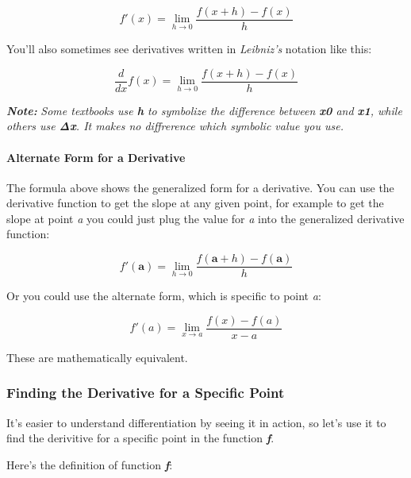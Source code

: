 \documentclass[11pt]{article}
\begin{document}
\begin{equation}f'(x) = \lim_{h \to 0} \frac{f(x + h) - f(x)}{h} \end{equation}

You'll also sometimes see derivatives written in \emph{Leibniz's}
notation like this:

\begin{equation}\frac{d}{dx}f(x) = \lim_{h \to 0} \frac{f(x + h) - f(x)}{h} \end{equation}

\textbf{\emph{Note:}} \emph{Some textbooks use \textbf{h} to symbolize
the difference between \textbf{x0} and \textbf{x1}, while others use
\textbf{Δx}. It makes no diffrerence which symbolic value you use.}

    \paragraph{Alternate Form for a
Derivative}\label{alternate-form-for-a-derivative}

The formula above shows the generalized form for a derivative. You can
use the derivative function to get the slope at any given point, for
example to get the slope at point \emph{a} you could just plug the value
for \emph{a} into the generalized derivative function:

\begin{equation}f'(\textbf{a}) = \lim_{h \to 0} \frac{f(\textbf{a} + h) - f(\textbf{a})}{h} \end{equation}

Or you could use the alternate form, which is specific to point
\emph{a}:

\begin{equation}f'(a) = \lim_{x \to a} \frac{f(x) - f(a)}{x - a} \end{equation}

These are mathematically equivalent.

    \subsubsection{Finding the Derivative for a Specific
Point}\label{finding-the-derivative-for-a-specific-point}

It's easier to understand differentiation by seeing it in action, so
let's use it to find the derivitive for a specific point in the function
\textbf{\emph{f}}.

Here's the definition of function \textbf{\emph{f}}:
\end{document}
